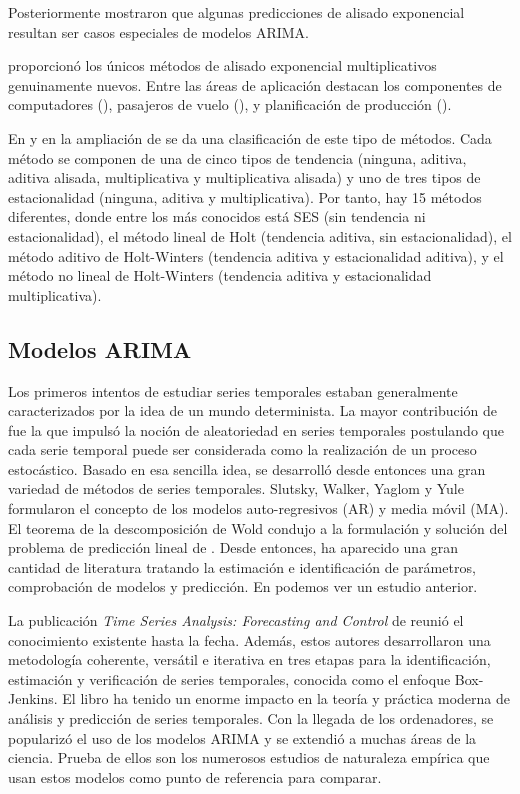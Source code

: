 \documentclass{llncs}
\begin{document}
Posteriormente \cite{Box1976} mostraron que algunas predicciones de alisado exponencial resultan ser casos especiales de modelos ARIMA.

\cite{Taylor2003715} proporcionó los únicos métodos de alisado exponencial multiplicativos genuinamente nuevos. Entre las áreas de aplicación destacan los componentes de computadores (\cite{GardnerJr1993245}), pasajeros de vuelo (\cite{Grubb200171}), y planificación de producción (\cite{Miller1993509}).

En \cite{Hyndman2002439} y en la ampliación de \cite{Taylor2003715} se da una clasificación de este tipo de métodos. Cada método se componen de una de cinco tipos de tendencia (ninguna, aditiva, aditiva alisada, multiplicativa y multiplicativa alisada) y uno de tres tipos de estacionalidad (ninguna, aditiva y multiplicativa). Por tanto, hay 15 métodos diferentes, donde entre los más conocidos está SES (sin tendencia ni estacionalidad), el método lineal de Holt (tendencia aditiva, sin estacionalidad), el método aditivo de Holt-Winters (tendencia aditiva y estacionalidad aditiva), y el método no lineal de Holt-Winters (tendencia aditiva y estacionalidad multiplicativa).


\subsection{Modelos ARIMA}

Los primeros intentos de estudiar series temporales estaban generalmente caracterizados por la idea de un mundo determinista. La mayor contribución de \cite{Yule1927267} fue la que impulsó la noción de aleatoriedad en series temporales postulando que cada serie temporal puede ser considerada como la realización de un proceso estocástico. Basado en esa sencilla idea, se desarrolló desde entonces una gran variedad de métodos de series temporales. Slutsky, Walker, Yaglom y Yule formularon el concepto de los modelos auto-regresivos (AR) y media móvil (MA). El teorema de la descomposición de Wold condujo a la formulación y solución del problema de predicción lineal de \cite{Kolmogorov19411}. Desde entonces, ha aparecido una gran cantidad de literatura tratando la estimación e identificación de parámetros, comprobación de modelos y predicción. En \cite{Newbold198323} podemos ver un estudio anterior.

La publicación \emph{Time Series Analysis: Forecasting and Control} de \cite{Box1976} reunió el conocimiento existente hasta la fecha. Además, estos autores desarrollaron una metodología coherente, versátil e iterativa en tres etapas para la identificación, estimación y verificación de series temporales, conocida como el enfoque Box-Jenkins. El libro ha tenido un enorme impacto en la teoría y práctica moderna de análisis y predicción de series temporales. Con la llegada de los ordenadores, se popularizó el uso de los modelos ARIMA y se extendió a muchas áreas de la ciencia. Prueba de ellos son los numerosos estudios de naturaleza empírica que usan estos modelos como punto de referencia para comparar.
\end{document}
